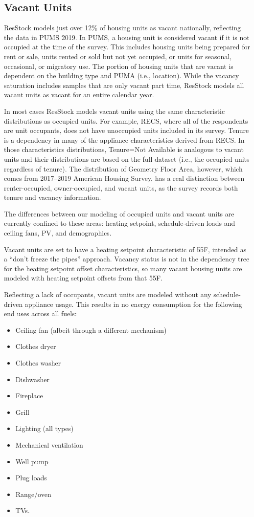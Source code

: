 \subsection{Vacant Units}\label{vacant_units}
ResStock models just over 12\% of housing units as vacant nationally, reflecting the data in PUMS 2019. In PUMS, a housing unit is considered vacant if it is not occupied at the time of the survey. This includes housing units being prepared for rent or sale, units rented or sold but not yet occupied, or units for seasonal, occasional, or migratory use. The portion of housing units that are vacant is dependent on the building type and PUMA (i.e., location). While the vacancy saturation includes samples that are only vacant part time, ResStock models all vacant units as vacant for an entire calendar year. 

In most cases ResStock models vacant units using the same characteristic distributions as occupied units. For example, RECS, where all of the respondents are unit occupants, does not have unoccupied units included in its survey. Tenure is a dependency in many of the appliance characteristics derived from RECS. In those characteristics distributions, Tenure=Not Available is analogous to vacant units and their distributions are based on the full dataset (i.e., the occupied units regardless of tenure). The distribution of Geometry Floor Area, however, which comes from 2017--2019 American Housing Survey, has a real distinction between renter-occupied, owner-occupied, and vacant units, as the survey records both tenure and vacancy information.

The differences between our modeling of occupied units and vacant units are currently confined to these areas: heating setpoint, schedule-driven loads and ceiling fans, PV, and demographics. 

Vacant units are set to have a heating setpoint characteristic of 55\degree F, intended as a ``don't freeze the pipes'' approach. Vacancy status is not in the dependency tree for the heating setpoint offset characteristics, so many vacant housing units are modeled with heating setpoint offsets from that 55\degree F. 

Reflecting a lack of occupants, vacant units are modeled without any schedule-driven appliance usage. This results in no energy consumption for the following end uses across all fuels:
\begin{itemize}
    \item Ceiling fan (albeit through a different mechanism)
    \item Clothes dryer
    \item Clothes washer
    \item Dishwasher
    \item Fireplace
    \item Grill
    \item Lighting (all types)
    \item Mechanical ventilation
    \item Well pump
    \item Plug loads
    \item Range/oven
    \item TVs.
\end{itemize}

